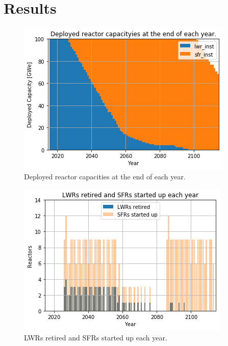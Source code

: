\section{Results}



\begin{figure}[htbp!]
	\begin{center}
		\includegraphics[scale=0.6]{./images/results/power_plot.png}
	\end{center}
        \caption{Deployed reactor capacities at the end of each year.}
	\label{fig:pow_plot}
\end{figure}



\begin{figure}[htbp!]
	\begin{center}
		\includegraphics[scale=0.6]{./images/results/dep.png}
	\end{center}
        \caption{\glspl{LWR} retired and \glspl{SFR} started up each year.}
	\label{fig:dep}
\end{figure}

